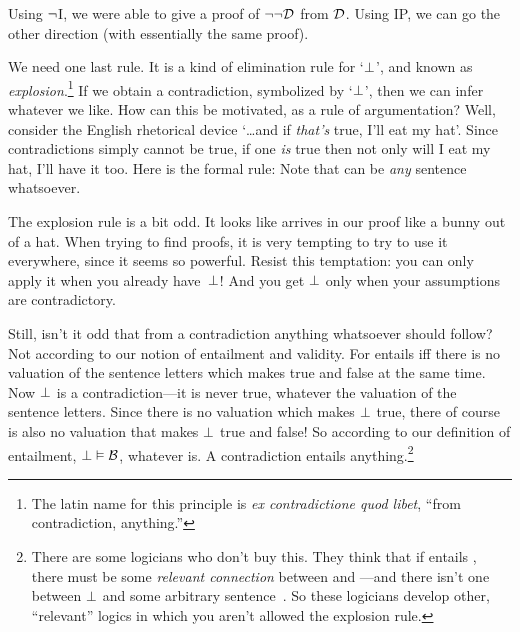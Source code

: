 Using $\neg$I, we were able to give a proof of $\neg\neg\mathcal{D}$ from $\mathcal{D}$. Using IP, we can go the other direction (with essentially the same proof).
	\begin{fitchproof}
		\open
		\close
	\end{fitchproof}

We need one last rule. It is a kind of elimination rule for `$\bot$', and known as \emph{explosion}.\footnote{The latin name for this principle is \emph{ex contradictione quod libet}, ``from contradiction, anything.''} If we obtain a contradiction, symbolized by `$\bot$', then we can infer whatever we like. How can this be motivated, as a rule of argumentation? Well, consider the English rhetorical device `\ldots and if \emph{that's} true, I'll eat my hat'. Since contradictions simply cannot be true, if one \emph{is} true then not only will I eat my hat, I'll have it too. Here is the formal rule:
Note that  can be \emph{any} sentence whatsoever.

The explosion rule is a bit odd. It looks like  arrives in our proof like a bunny out of a hat. When trying to find proofs, it is very tempting to try to use it everywhere, since it seems so powerful. Resist this temptation: you can only apply it when you already have~$\bot$!  And you get $\bot$ only when your assumptions are contradictory.

Still, isn't it odd that from a contradiction anything whatsoever should follow? Not according to our notion of entailment and validity. For  entails  iff there is no valuation of the sentence letters which makes  true and  false at the same time. Now $\bot$ is a contradiction---it is never true, whatever the valuation of the sentence letters. Since there is no valuation which makes $\bot$ true, there of course is also no valuation that makes $\bot$ true and  false! So according to our definition of entailment, $\bot \vDash \mathcal{B}$, whatever  is. A contradiction entails anything.\footnote{There are some logicians who don't buy this. They think that if  entails , there must be some \emph{relevant connection} between  and ---and there isn't one between $\bot$ and some arbitrary sentence~. So these logicians develop other, ``relevant'' logics in which you aren't allowed the explosion rule.}

